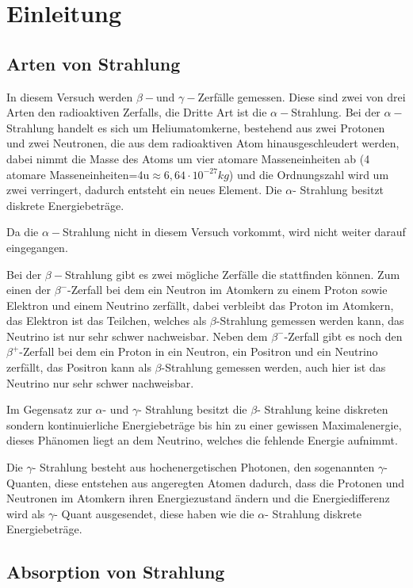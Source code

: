 \section{Einleitung}


\subsection{Arten von Strahlung}

In diesem Versuch werden $\beta-$und $\gamma-$Zerfälle gemessen.
Diese sind zwei von drei Arten den radioaktiven Zerfalls, die Dritte
Art ist die $\alpha-$Strahlung. Bei der $\alpha-$Strahlung handelt
es sich um Heliumatomkerne, bestehend aus zwei Protonen und zwei Neutronen,
die aus dem radioaktiven Atom hinausgeschleudert werden, dabei nimmt
die Masse des Atoms um vier atomare Masseneinheiten ab (4 atomare
Masseneinheiten=4u$\approx6,64\cdot10^{-27}kg$) und die Ordnungszahl
wird um zwei verringert, dadurch entsteht ein neues Element. Die $\alpha$-
Strahlung besitzt diskrete Energiebeträge.

Da die $\alpha-$Strahlung nicht in diesem Versuch vorkommt, wird
nicht weiter darauf eingegangen.

Bei der $\beta-$Strahlung gibt es zwei mögliche Zerfälle die stattfinden
können. Zum einen der $\beta^{-}$-Zerfall bei dem ein Neutron im
Atomkern zu einem Proton sowie Elektron und einem Neutrino zerfällt,
dabei verbleibt das Proton im Atomkern, das Elektron ist das Teilchen,
welches als $\beta$-Strahlung gemessen werden kann, das Neutrino
ist nur sehr schwer nachweisbar. Neben dem $\beta^{-}$-Zerfall gibt
es noch den $\beta^{+}$-Zerfall bei dem ein Proton in ein Neutron,
ein Positron und ein Neutrino zerfällt, das Positron kann als $\beta$-Strahlung
gemessen werden, auch hier ist das Neutrino nur sehr schwer nachweisbar.

Im Gegensatz zur $\alpha$- und $\gamma$- Strahlung besitzt die $\beta$-
Strahlung keine diskreten sondern kontinuierliche Energiebeträge bis
hin zu einer gewissen Maximalenergie, dieses Phänomen liegt an dem
Neutrino, welches die fehlende Energie aufnimmt.

Die $\gamma$- Strahlung besteht aus hochenergetischen Photonen, den
sogenannten $\gamma$- Quanten, diese entstehen aus angeregten Atomen
dadurch, dass die Protonen und Neutronen im Atomkern ihren Energiezustand
ändern und die Energiedifferenz wird als $\gamma$- Quant ausgesendet,
diese haben wie die $\alpha$- Strahlung diskrete Energiebeträge.


\subsection{Absorption von Strahlung}


